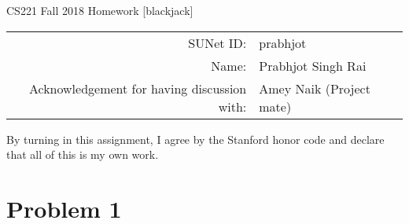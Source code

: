 \documentclass[12pt]{article}
\begin{document}
\begin{center}
{\Large CS221 Fall 2018 Homework [blackjack]}

\begin{tabular}{rl}
SUNet ID: & prabhjot \\
Name: & Prabhjot Singh Rai \\
Acknowledgement for having discussion with: & Amey Naik (Project mate)
\end{tabular}
\end{center}

By turning in this assignment, I agree by the Stanford honor code and declare
that all of this is my own work.

\section*{Problem 1}
\end{document}
